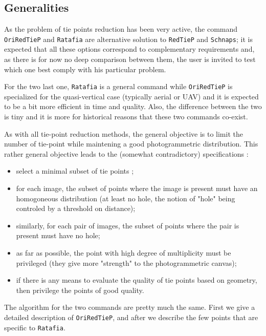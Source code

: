 \subsection{Generalities}

As the problem of tie points reduction has been very active, the command  {\tt OriRedTieP} 
and {\tt Ratafia} are alternative solution to  {\tt RedTieP} and {\tt Schnaps}; it is
expected that all these options correspond to complementary requirements and, as there is for 
now no deep comparison between them, the user is invited to test which one best comply with his particular problem.

For the two last one,  {\tt Ratafia} is a general command while {\tt OriRedTieP} is specialized for 
the quasi-vertical case (typically aerial or UAV) and it is expected to be a bit more
efficient in time and quality. Also, the difference between the two is tiny and it is more for historical reasons
that these two commands co-exist.



As with all tie-point reduction methods, the general  objective is to
limit the number of tie-point while maintening a good photogrammetric distribution. 
This rather general objective leads to the (somewhat contradictory) specifications :

\begin{itemize}
   \item select a minimal subset of tie points ;
   \item for each image, the subset of points where the image is present must have an homogoneous distribution
         (at least no hole, the notion of "hole" being controled by a threshold on distance);
   \item similarly, for each pair of images, the subset of points where the pair is present must have no hole;
   \item as far as possible, the point with high degree of multiplicity must be privileged (they give
         more "strength" to the photogrammetric canvas);

   \item if there is any means to evaluate the quality of tie points based on geometry, then privilege the points
         of good quality.

\end{itemize}

The algorithm for the two commands are pretty much the same. First we give a detailed description of {\tt OriRedTieP},
and after we describe  the few points that are  specific to {\tt Ratafia}.


